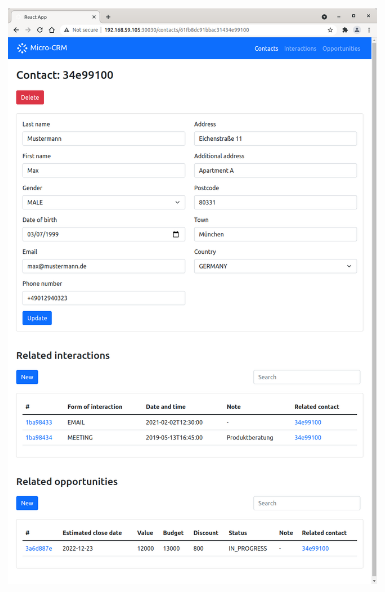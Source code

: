 \begin{figure}[H] 
    \centering
    \includegraphics[width=0.87\textwidth]{figures/FrontendKontakt.png}
\end{figure}